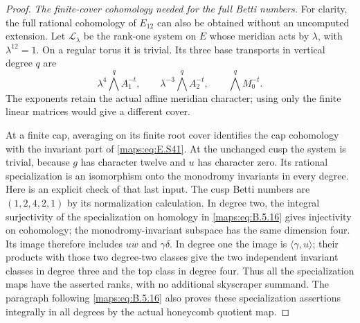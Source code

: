 \begin{proof}
\emph{The finite-cover cohomology needed for the full Betti numbers.}
For clarity, the full rational cohomology of $E_{12}$
can also be obtained without an uncomputed extension.
Let $\mathcal L_\lambda$ be the rank-one system on $E$
whose meridian acts by $\lambda$, with $\lambda^{12}=1$.
On a regular torus it is trivial. Its three base transports
in vertical degree $q$ are
\[
 \lambda^4\bigwedge^q A_1^{-t},\qquad
 \lambda^{-3}\bigwedge^q A_2^{-t},\qquad
                         \bigwedge^q M_0^{-t}.
 \tag{E.S41}\label{maps:eq:E.S41}
\]
The exponents retain the actual affine meridian character;
using only the finite linear matrices would give a different
cover.

At a finite cap, averaging on its finite root cover
identifies the cap cohomology with the invariant part of
\eqref{maps:eq:E.S41}. At the unchanged cusp the system is trivial,
because $g$ has character twelve and $u$ has character zero.
Its rational specialization is an isomorphism onto the
monodromy invariants in every degree. Here is an explicit
check of that last input. The cusp Betti numbers are
$(1,2,4,2,1)$ by its normalization calculation. In degree
two, the integral surjectivity of the specialization on
homology in \eqref{maps:eq:B.5.16} gives injectivity on cohomology;
the monodromy-invariant subspace has the same dimension
four. Its image therefore includes $uw$ and $\gamma\delta$.
In degree one the image is $\langle\gamma,u\rangle$;
their products with those two degree-two classes give the
two independent invariant classes in degree three and
the top class in degree four. Thus all the specialization
maps have the asserted ranks, with no additional
skyscraper summand. The paragraph following \eqref{maps:eq:B.5.16}
also proves these specialization assertions integrally
in all degrees by the actual honeycomb quotient map.


\end{proof}
